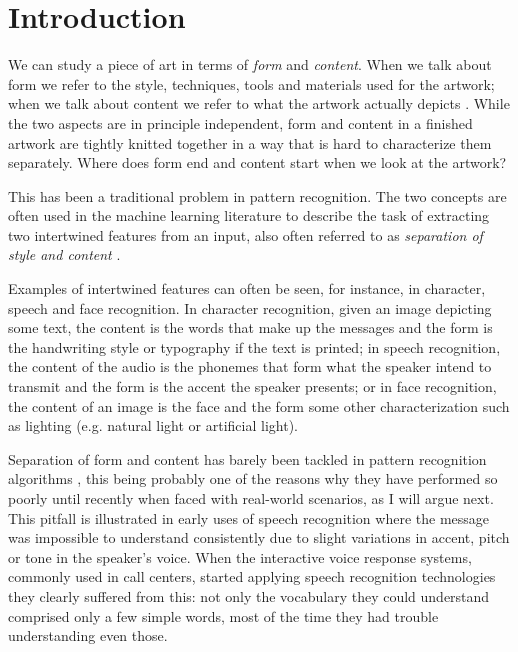 
\chapter{Introduction}
\label{chap:intro}


We can study a piece of art in terms of \emph{form} and \emph{content}.
When we talk about form we refer to the style, techniques, tools and materials used for the artwork; when we talk about content we refer to what the artwork actually depicts \cite{Esaak}.
While the two aspects are in principle independent, form and content in a finished artwork are tightly knitted together in a way that is hard to characterize them separately. Where does form end and content start when we look at the artwork?

This has been a traditional problem in pattern recognition.
The two concepts are often used in the machine learning literature to describe the task of extracting two intertwined features from an input, also often referred to as \emph{separation of style and content} \cite{Tenenbaum1997,Tenenbaum2000}.

Examples of intertwined features can often be seen, for instance, in character, speech and face recognition.
In character recognition, given an image depicting some text, the content is the words that make up the messages and the form is the handwriting style or typography if the text is printed; in speech recognition, the content of the audio is the phonemes that form what the speaker intend to transmit and the form is the accent the speaker presents; or in face recognition, the content of an image is the face and the form some other characterization such as lighting (e.g. natural light or artificial light).

Separation of form and content has barely been tackled in pattern recognition algorithms \cite{Karayev2014}, this being probably one of the reasons why they have performed so poorly until recently when faced with real-world scenarios, as I will argue next.
This pitfall is illustrated in early uses of speech recognition where the message was impossible to understand consistently due to slight variations in accent, pitch or tone in the speaker's voice.
When the interactive voice response systems, commonly used in call centers, started applying speech recognition technologies they clearly suffered from this: not only the vocabulary they could understand comprised only a few simple words, most of the time they had trouble understanding even those.

